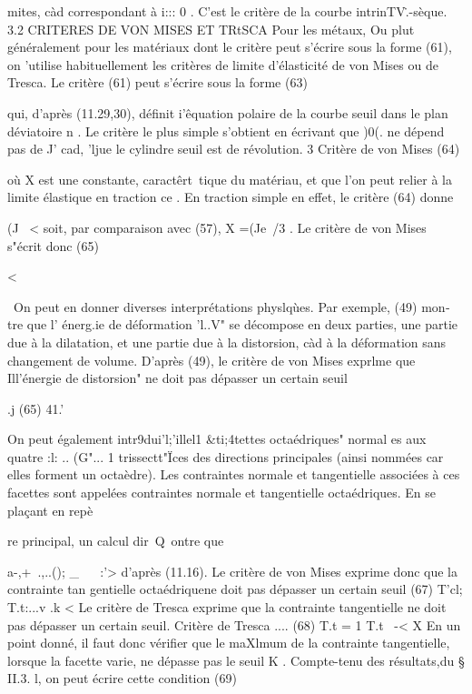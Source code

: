 {{mites, càd correspondant à i::: 0 . 
C'est le critère de la courbe intrin­TV\..-sèque. 
3.2 CRITERES DE VON MISES ET TRtSCA 
Pour les métaux, Ou plut généralement pour les matériaux dont le critère peut s'écrire sous la forme (61), on 'utilise habituellement les cri­tères de limite d'élasticité de von Mises ou de Tresca. Le critère (61) peut s'écrire sous la forme 
(63) 


qui, d'après (11.29,30), définit i'êquation polaire de la courbe seuil dans le plan déviatoire n . Le critère le plus simple s'obtient en écrivant que )0(. ne dépend pas de J' cad, 'ljue le cylindre seuil est de révolution.
3 
Critère de von Mises 
(64) 


où X est une constante, caractêrt~tique du matériau, et que l'on peut relier à la limite élastique en traction ce . En traction simple en effet, le cri­tère (64) donne 

(J~ 
< 
soit, par comparaison avec (57), X =(Je~/3 . Le critère de von Mises s"écrit donc 
(65) 

< 

\
On peut en donner diverses interprétations physlqùes. Par exemple, (49) mon­
tre que l' énerg.ie de déformation 'l..V" se décompose en deux parties, une partie due à la dilatation, et une partie due à la distorsion, càd à la déformation 
sans changement de volume. D'après (49), le critère de von Mises exprlme que 
Ill'énergie de distorsion" ne doit pas dépasser un certain seuil 


.j
(65) 
41.'­

On peut également intr9dui'l;'illel1 &ti;4tettes octaédriques" normal es aux quatre 
:l: .. (G"... 1 	trissectt"Ïces des directions prin­cipales (ainsi nommées car elles forment un octaèdre). Les contrain­tes normale et tangentielle asso­ciées à ces facettes sont appelées contraintes normale et tangentielle octaédriques. En se plaçant en repè­

re principal, un calcul dir~Q~ontre que 

a-,+~.,..(); _~ 
~ 	:'> 
d'après (11.16). Le critère de von Mises exprime donc que la contrainte tan­
gentielle octaédriquene doit pas dépasser un certain seuil 
(67) T'cl; 
T.t:...v
.k < 
Le critère de Tresca exprime que la contrainte tangentielle ne doit 
pas dépasser un certain seuil. 
Critère de Tresca 
.... 
(68) 
T.t = 1 T.t \ -< X 
En un point donné, il faut donc vérifier que le maXlmum de la con­trainte tangentielle, lorsque la facette varie, ne dépasse pas le seuil K . 
Compte-tenu des résultats,du § II.3. l, on peut écrire cette condition 
(69) 

}}
